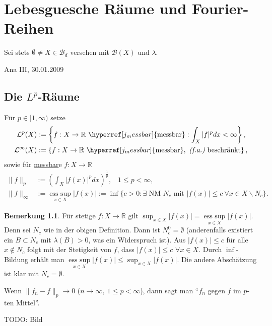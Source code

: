 \documentclass[a4paper]{report}
\newcommand{\R}{\mathbb{R}}
\newcommand{\Borel}{\mathcal{B}}
\newcommand{\Bd}{\Borel_d}
\newcommand{\Leb}{\mathcal{L}}
\newcommand{\jlabel}[1]{\label{j_#1}}
\newcommand{\jshortlink}[1]{\jhyperref{#1}{\text{#1}}}
\newcommand{\jhyperref}[2]{\hyperref[j_#1]{#2}}
\newcommand{\jlink}[1]{\jhyperref{#1}{#1}}
\newcommand{\fa}{\text{\textit{(f.a.)}}}
\newcommand{\jabb}[3]{ #1: #2 \rightarrow #3 }
\newcommand{\jspace}{\vspace{8pt}}
\newcommand{\jspacesmall}{\vspace{4pt}}
\newcommand{\jdate}[1]{\jspacesmall\begin{center}\jlabel{#1}\tiny{Ana III, #1}\end{center}}
\newcommand{\esssup}{\mathop{\mathrm{ess\ sup}}\limits}
\theoremstyle{plain}
\theoremstyle{definition}
\newtheorem*{bem*}{Bemerkung}
\begin{document}
{{{{\chapter{Lebesguesche Räume und Fourier-Reihen}
    
    Sei stets $\emptyset \ne X \in \Bd$ versehen mit $\Borel(X)$ und $\lambda$.
    
\jdate{30.01.2009}

\section{Die $L^p$-Räume}

Für $p \in [1,\infty)$ setze
\[
    \begin{split}
        \Leb^p(X) &:= \left\{\jabb{f}{X}{\R}\ \jshortlink{messbar} : \int_X |f|^p dx < \infty \right\},\\
        \Leb^\infty(X) &:= \left\{\jabb{f}{X}{\R}\ \jshortlink{messbar}, \ \fa \text{ beschränkt} \right\},
    \end{split}
\]
sowie für \jlink{messbar}e $\jabb{f}{X}{\R}$
\[
    \begin{split}
        \lVert f \rVert_p &:= \left(\int_X |f(x)|^p dx \right)^\frac{1}{p}, \hspace{10pt} 1\le p < \infty,\\
        \lVert f \rVert_\infty &:= \esssup_{x\in X} |f(x)| := \inf \{c>0 : \exists \text{ NM } N_c \text{ mit } |f(x)| \le c \ \forall x\in X\backslash N_c\}.
    \end{split}
\]

\begin{bem*}
    Für stetige $\jabb{f}{X}{\R}$ gilt $\sup_{x\in X} |f(x)| = \esssup_{x\in X} |f(x)|$. Denn sei $N_c$ wie in der obigen Definition. Dann ist $N_c^0=\emptyset$ (anderenfalls existiert ein $B\subset N_c$ mit $\lambda(B) > 0$, was ein Widerspruch ist). Aus $|f(x)| \le c$ für alle $x\notin N_c$ folgt mit der Stetigkeit von $f$, dass $|f(x)|\le c$ $\forall x\in X$. Durch $\inf$-Bildung erhält man $\esssup_{x\in X} |f(x)| \le \sup_{x\in X} |f(x)|$. Die andere Abschätzung ist klar mit $N_c = \emptyset$.
\end{bem*}

Wenn $\lVert f_n - f \rVert_p \to 0$ ($n\to \infty,\ 1\le p < \infty$), dann sagt man ``$f_n$ gegen $f$ im $p$-ten Mittel''.

\jspace

TODO: Bild

\jspace

}}}}
\end{document}
